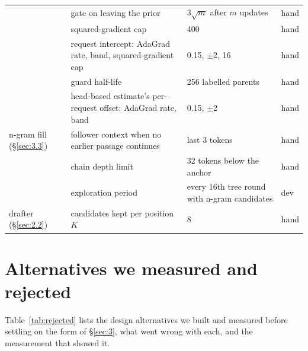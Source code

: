 \documentclass[10pt,twocolumn,letterpaper]{article}
\begin{document}
\begin{table}[t]
\begin{tabularx}{\textwidth}{lXXl}
 & gate on leaving the prior & $3\sqrt{m}$ after $m$ updates & hand \\
 & squared-gradient cap & 400 & hand \\
 & request intercept: AdaGrad rate, band, squared-gradient cap & 0.15, $\pm$2, 16 & hand \\
 & guard half-life & 256 labelled parents & hand \\
 & head-based estimate's per-request offset: AdaGrad rate, band & 0.15, $\pm$2 & hand \\
n-gram fill (\S\ref{sec:3.3}) & follower context when no earlier passage continues & last 3 tokens & hand \\
 & chain depth limit & 32 tokens below the anchor & hand \\
 & exploration period & every 16th tree round with n-gram candidates & dev \\
drafter (\S\ref{sec:2.2}) & candidates kept per position $K$ & 8 & hand \\
\bottomrule
\end{tabularx}
\end{table}

\section{Alternatives we measured and rejected}\label{app:C}

Table~\ref{tab:rejected} lists the design alternatives we built and measured before settling on the form of \S\ref{sec:3}, what went wrong with each, and the measurement that showed it.
\end{document}
